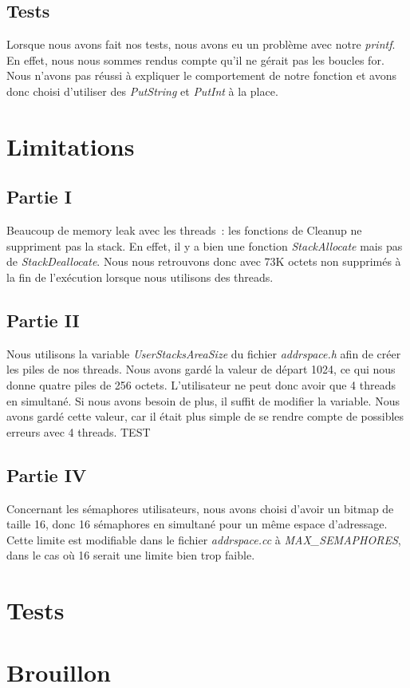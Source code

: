 \documentclass{article}
\begin{document}
\subsection{Tests}
Lorsque nous avons fait nos tests, nous avons eu un problème avec notre
\textit{printf}. En effet, nous nous sommes rendus compte qu'il ne gérait pas
les boucles for. Nous n'avons pas réussi à expliquer le comportement de notre
fonction et avons donc choisi d'utiliser des \textit{PutString} et
\textit{PutInt} à la place.

\section{Limitations}
\subsection{Partie I}
Beaucoup de memory leak avec les threads : les fonctions de Cleanup ne
suppriment pas la stack. En effet, il y a bien une fonction
\textit{StackAllocate} mais pas de \textit{StackDeallocate}. Nous nous
retrouvons donc avec 73K octets non supprimés à la fin de l'exécution lorsque
nous utilisons des threads.

\subsection{Partie II}
Nous utilisons la variable \textit{UserStacksAreaSize} du fichier
\textit{addrspace.h} afin de créer les piles de nos threads. Nous avons gardé
la valeur de départ 1024, ce qui nous donne quatre piles de 256 octets.
L'utilisateur ne peut donc avoir que 4 threads en simultané. Si nous avons
besoin de plus, il suffit de modifier la variable. Nous avons gardé cette
valeur, car il était plus simple de se rendre compte de possibles erreurs avec
4 threads. TEST

\subsection{Partie IV}
Concernant les sémaphores utilisateurs, nous avons choisi d'avoir un bitmap de
taille 16, donc 16 sémaphores en simultané pour un même espace d'adressage.
Cette limite est modifiable dans le fichier \textit{addrspace.cc} à
\textit{MAX\_SEMAPHORES}, dans le cas où 16 serait une limite bien trop faible.

\section{Tests}

\section{Brouillon}
\end{document}
